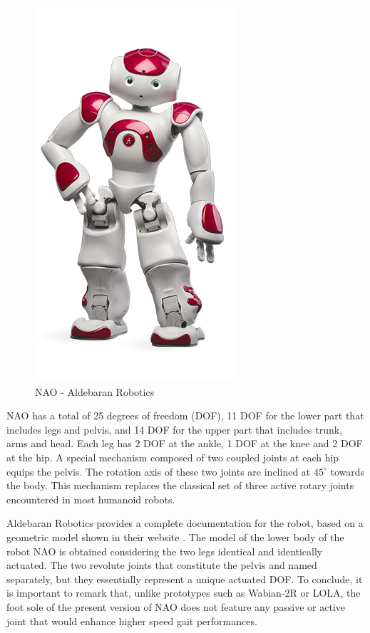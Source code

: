 \begin{figure}[h!]
    \centering
    \includegraphics[scale=0.55]{images/nao-robot.jpg}\hfill
    \caption{NAO - Aldebaran Robotics \cite{aldebaran-masses}}\hfill
    \label{fig: nao-robot}
\end{figure}

NAO has a total of 25 degrees of freedom (DOF), 11 DOF for the lower part that includes legs and pelvis, and 14 DOF for the upper part that includes trunk, 
arms and head. Each leg has 2 DOF at the ankle, 1 DOF at the knee and 2 DOF at the hip. A special mechanism composed of two coupled joints at each hip equips 
the pelvis. The rotation axis of these two joints are inclined at $45^\circ$ towards the body. This mechanism replaces the classical set of three active rotary joints 
encountered in most humanoid robots.


Aldebaran Robotics provides a complete documentation for the robot, based on a geometric model shown in their website \cite{aldebaran-masses}. The model of the lower body of the robot 
NAO is obtained considering the two legs identical and identically actuated. The two revolute joints that constitute the pelvis and named separately, but 
they essentially represent a unique actuated DOF. To conclude, it is important to remark that, unlike prototypes such as Wabian-2R or LOLA, the foot sole of 
the present version of NAO does not feature any passive or active joint that would enhance higher speed gait performances.


